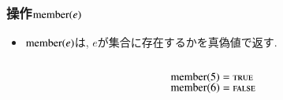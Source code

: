 \documentclass[main]{subfiles}
\begin{document}
\begin{frame}\frametitle{操作$\mathrm{member}(e)$}
\begin{itemize}
\item $\mathrm{member}(e)$は, $e$が集合に存在するかを真偽値で返す.\\
\end{itemize}
\begin{columns}[c]
	\begin{column}{0.5\linewidth}
		
	\end{column}
	\begin{column}{0.49\linewidth}
		$\mathrm{member}(5) = \text{\textsc{true}}$\\
		$\mathrm{member}(6) = \text{\textsc{false}}$\\
	\end{column}
\end{columns}
\end{frame}
\end{document}
